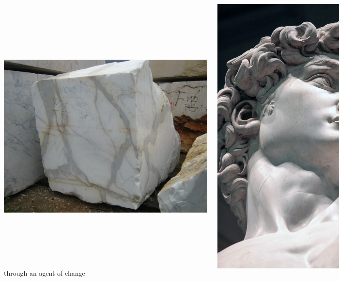 \documentclass[xcolor=dvipsnames]{beamer}
\begin{document}
\begin{frame}{}
\begin{figure}
  \centering
  \begin{columns}
    \centering
    \caption {This can be many things\ldots}
    \includegraphics[width=0.99\textwidth]{marble}
    \centering
    \caption {through an agent of change}
    \includegraphics[width=0.99\textwidth]{david}
  \end{columns}
\end{figure}
\end{frame}
\end{document}
